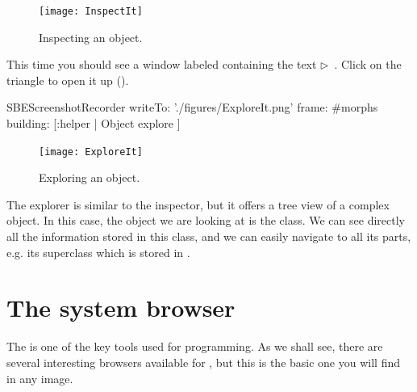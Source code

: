 \documentclass[a4paper,10pt,twoside]{book}
\begin{document}
\begin{figure}[htb]
\centerline {\texttt{[image: InspectIt]}}
\caption{Inspecting an object. \label{fig:inspectit}}
\end{figure}



This time you should see a window labeled  containing the text
\mbox{$\triangleright$ }.
Click on the triangle to open it up ().

\begin{ExecuteSmalltalkScript}
SBEScreenshotRecorder writeTo: './figures/ExploreIt.png' frame: #morphs building: [:helper |
  Object explore
]
\end{ExecuteSmalltalkScript}
\begin{figure}[htb]
\centerline {\texttt{[image: ExploreIt]}}
\caption{Exploring an object. \label{fig:exploreit}}
\end{figure}

The explorer is similar to the inspector, but it offers a tree view of a complex object.
In this case, the object we are looking at is the  class.
We can see directly all the information stored in this class, and we can easily navigate to all its parts, e.g. its superclass which is stored in .

\section{The system browser}

The  is one of the key tools used for programming.
As we shall see, there are several interesting browsers available for \sq, but this is the basic one you will find in any image.
\end{document}
